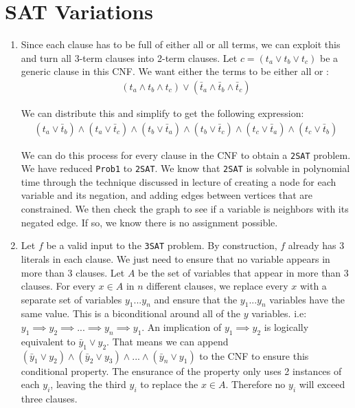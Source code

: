 \documentclass{article}
\begin{document}
\newpage
\section{SAT Variations}
\begin{enumerate}
        \item Since each clause has to be full of either all \True or all \False terms, we can exploit this and turn all 3-term clauses into 2-term clauses.
                Let $c = (t_a \lor t_b \lor t_c )$ be a generic clause in this CNF. We want either the terms to be either all \True or \False:
                \begin{align*}
                        (t_a \land t_b \land t_c) \lor (\bar{t}_a \land \bar{t}_b \land \bar{t}_c)
                \end{align*}

                We can distribute this and simplify to get the following expression:
                \begin{align*}
                        (t_a \lor \bar{t}_b) \land (t_a \lor \bar{t}_c) \land (t_b \lor \bar{t}_a)
                        \land (t_b \lor \bar{t}_c) \land (t_c \lor \bar{t}_a) \land (t_c \lor \bar{t}_b) 
                \end{align*}                
                
                We can do this process for every clause in the CNF to obtain a \texttt{2SAT} problem. 
                We have reduced \texttt{Prob1} to \texttt{2SAT}. We know that \texttt{2SAT} is solvable in polynomial time through the technique discussed in lecture of creating a node for each variable and its negation, and adding edges between vertices that are constrained.
                We then check the graph to see if a variable is neighbors with its negated edge. If so, we know there is no assignment possible. 

        \newpage
        \item Let $f$ be a valid input to the \texttt{3SAT} problem. By construction, $f$ already has 3 literals in each clause.
                We just need to ensure that no variable appears in more than 3 clauses. Let $A$ be the set of variables that appear in more than 3 clauses.
                For every $x \in A$ in $n$ different clauses, we replace every $x$ with a separate set of variables $y_{1} ... y_n$ and ensure that the $y_1 ... y_n$ variables have the same value.
                This is a biconditional around all of the $y$ variables. i.e: $y_{1} \implies y_2 \implies ... \implies y_n \implies y_1$. 
                An implication of $y_1 \implies y_2$ is logically equivalent to $\bar{y}_1 \lor y_2$. That means we can append $(\bar{y}_1 \lor y_2) \land (\bar{y}_2 \lor y_3) \land ... \land (\bar{y}_n \lor y_1)$ to the CNF to ensure this conditional property.
                The ensurance of the property only uses 2 instances of each $y_i$, leaving the third $y_i$ to replace the $x \in A$. Therefore no $y_i$ will exceed three clauses.


\end{enumerate}
\end{document}
